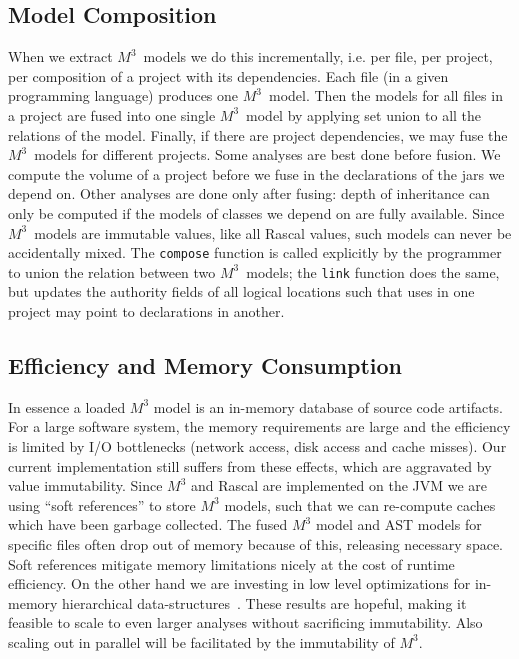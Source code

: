 \documentclass[conference]{IEEEtran}
\newcommand{\mthree}{\ensuremath{M^3}\!\xspace}
\begin{document}
\subsection{Model Composition} When we extract \mthree\  models we do this
incrementally, i.e. per file, per project, per composition of a project with
its dependencies. Each file (in a given programming language) produces one
\mthree\  model. Then the models for all files in a project are fused into one
single \mthree\  model by applying set union to all the relations of the
model. Finally, if there are project dependencies, we may fuse the \mthree\
models for different projects.
%
Some analyses are best done before fusion. We compute the volume of a project
before we fuse in the declarations of the jars we depend on. Other analyses
are done only after fusing: depth of inheritance can only be computed if the
models of classes we depend on are fully available. Since \mthree\  models are
immutable values, like all Rascal values, such models can never be accidentally
mixed. The \texttt{compose} function is called
explicitly by the programmer to union the relation between two \mthree\ models;
the \texttt{link} function does the same, but updates the authority fields
of all logical locations such that uses in one project may point to
declarations in another.


\subsection{Efficiency and Memory Consumption}

In essence a loaded \mthree model is an in-memory database of source code
artifacts. For a large software system, the memory requirements are large and the
efficiency is limited by I/O bottlenecks (network access, disk access and
cache misses). Our current implementation still suffers from these effects,
which are aggravated by value immutability.
%
Since \mthree and Rascal are implemented on the JVM we are using ``soft
references'' to store \mthree models, such that we can re-compute caches which
have been garbage collected. The fused \mthree model and AST models for
specific files often drop out of memory because of this, releasing necessary
space. Soft references mitigate memory limitations nicely at the cost of
runtime efficiency.
%
On the other hand we are investing in low level optimizations for in-memory
hierarchical data-structures~\cite{BJKO00,gpce}. These results are hopeful,
making it feasible to scale to even larger analyses without sacrificing
immutability. Also scaling out in parallel will be facilitated by the immutability of \mthree.
\end{document}
